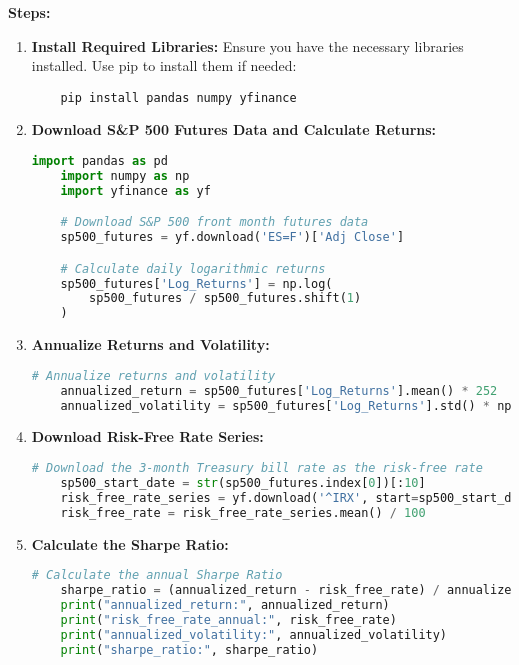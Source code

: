 \documentclass{article}
\begin{document}
\textbf{Steps:}
\begin{enumerate}
    \item \textbf{Install Required Libraries:} Ensure you have the necessary libraries installed. Use pip to install them if needed:
    \begin{verbatim}
    pip install pandas numpy yfinance
    \end{verbatim}

    \item \textbf{Download S\&P 500 Futures Data and Calculate Returns:}
    \begin{lstlisting}[language=Python]
    import pandas as pd
    import numpy as np
    import yfinance as yf

    # Download S&P 500 front month futures data
    sp500_futures = yf.download('ES=F')['Adj Close']

    # Calculate daily logarithmic returns
    sp500_futures['Log_Returns'] = np.log(
        sp500_futures / sp500_futures.shift(1)
    )
    \end{lstlisting}

    \item \textbf{Annualize Returns and Volatility:}
    \begin{lstlisting}[language=Python]
    # Annualize returns and volatility
    annualized_return = sp500_futures['Log_Returns'].mean() * 252
    annualized_volatility = sp500_futures['Log_Returns'].std() * np.sqrt(252)
    \end{lstlisting}

    \item \textbf{Download Risk-Free Rate Series:}
    \begin{lstlisting}[language=Python]
    # Download the 3-month Treasury bill rate as the risk-free rate
    sp500_start_date = str(sp500_futures.index[0])[:10]
    risk_free_rate_series = yf.download('^IRX', start=sp500_start_date)['Adj Close']
    risk_free_rate = risk_free_rate_series.mean() / 100
    \end{lstlisting}

    \item \textbf{Calculate the Sharpe Ratio:}
    \begin{lstlisting}[language=Python]
    # Calculate the annual Sharpe Ratio
    sharpe_ratio = (annualized_return - risk_free_rate) / annualized_volatility
    print("annualized_return:", annualized_return)
    print("risk_free_rate_annual:", risk_free_rate)
    print("annualized_volatility:", annualized_volatility)
    print("sharpe_ratio:", sharpe_ratio)
    \end{lstlisting}
\end{enumerate}
\end{document}
